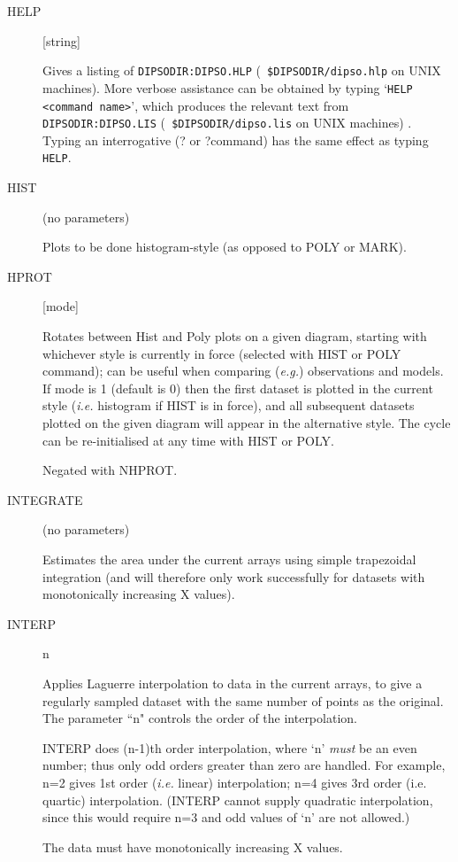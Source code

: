 \begin {description}
\item [HELP] [string]

Gives a listing of {\tt DIPSODIR:DIPSO.HLP} ({\tt
\$DIPSODIR/dipso.hlp} on UNIX machines). More verbose assistance can
be obtained by typing `{\tt HELP} \verb+<command name>+', which
produces the relevant text from {\tt DIPSODIR:DIPSO.LIS} ({\tt
\$DIPSODIR/dipso.lis} on UNIX machines) . Typing an interrogative (?
or ?command) has the same effect as typing {\tt HELP}.

\item [HIST] (no parameters)

Plots to be done histogram-style (as opposed to POLY or MARK).


\item [HPROT] [mode]

Rotates between Hist and Poly plots on a given diagram, starting with
whichever style is currently in force (selected with HIST or POLY
command); can be useful when comparing ({\em e.g.}) observations and
models. If mode is 1 (default is 0) then the first dataset is plotted
in the current style ({\em i.e.} histogram if HIST is in force), and
all subsequent datasets plotted on the given diagram will appear in
the alternative style. The cycle can be re-initialised at any time
with HIST or POLY.

Negated with NHPROT.

\item [INTEGRATE] (no parameters)

Estimates the area under the current arrays using simple trapezoidal
integration (and will therefore only work successfully for datasets
with monotonically increasing X values).

\item [INTERP] n

Applies Laguerre interpolation to data in the current arrays, to give
a regularly sampled dataset with the same number of points as the
original. The parameter ``n" controls the order of the interpolation.

INTERP does (n-1)th order interpolation, where `n' {\it must}\/ be an
even number;  thus only odd orders greater than zero are handled.   
For example, n=2 gives 1st order ({\em i.e.} linear) interpolation;
n=4 gives 3rd order (i.e. quartic) interpolation. (INTERP cannot
supply quadratic interpolation, since this would require n=3 and odd
values of `n' are not allowed.)

The data must have monotonically increasing X values.


\end{description}
